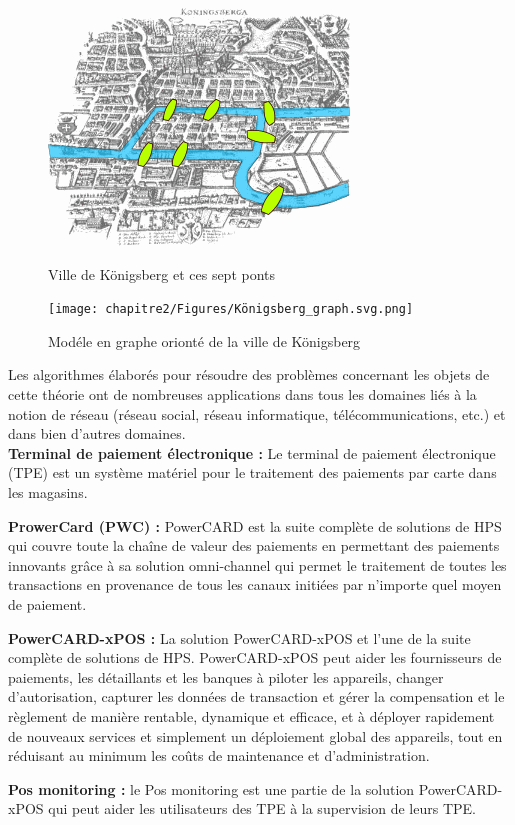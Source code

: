 \begin{figure}[h!]  
  \centering
    \includegraphics[width=0.4 \textwidth]{chapitre2/Figures/Konigsberg_bridges.png}
  \caption{Ville de Königsberg et ces sept ponts}
  \centering
    \texttt{[image: chapitre2/Figures/Königsberg\_graph.svg.png]}
  \caption{Modéle en graphe orionté de la ville de Königsberg}
\end{figure}

Les algorithmes élaborés pour résoudre des problèmes concernant les objets de cette théorie ont de nombreuses applications dans tous les domaines liés à la notion de réseau (réseau social, réseau informatique, télécommunications, etc.) et dans bien d'autres domaines.\\



\textbf{Terminal de paiement électronique :} Le terminal de paiement électronique (TPE) est un système matériel pour le traitement des paiements par carte dans les magasins. 

%


\textbf{ProwerCard (PWC) :} PowerCARD est la suite complète de solutions de HPS qui couvre toute la chaîne de valeur des paiements en permettant des paiements innovants grâce à sa solution omni-channel qui permet le traitement de toutes les transactions en provenance de tous les canaux initiées par n'importe quel moyen de paiement.

\textbf{PowerCARD-xPOS :} La solution PowerCARD-xPOS et l'une de la suite complète de solutions de HPS. PowerCARD-xPOS peut aider les fournisseurs de paiements, les détaillants et les banques à piloter les appareils, changer d'autorisation, capturer les données de transaction et gérer la compensation et le règlement de manière rentable, dynamique et efficace, et à déployer rapidement de nouveaux services et simplement un déploiement global des appareils, tout en réduisant au minimum les coûts de maintenance et d'administration.

\textbf{Pos monitoring :} le Pos monitoring est une partie de la solution PowerCARD-xPOS qui peut aider les utilisateurs des TPE à la supervision de leurs TPE.